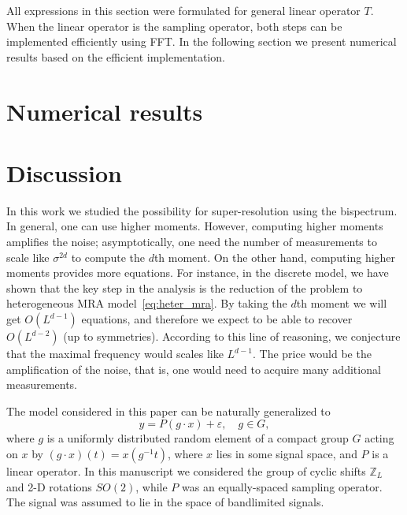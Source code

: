 \documentclass[english,12pt]{article}
\newcommand{\TODO}[1]{{\color{red}{[#1]}}}
\numberwithin{equation}{section}
\numberwithin{thm}{section} %
\begin{document}
All expressions in this section were formulated for general linear operator $T$. When the linear operator is the sampling operator, both steps can be implemented efficiently using FFT. In the following section we present numerical results based on the efficient implementation. 

\section{Numerical results}


\section{Discussion} \label{sec:future_work}


In this work we studied the possibility for super-resolution using the bispectrum. In general, one can use higher moments. However, computing higher moments amplifies the noise; asymptotically, one need the number of measurements to scale like $\sigma^{2d}$ to compute the $d$th moment. On the other hand, computing higher moments provides more equations. For instance, in the discrete model, we have shown that the key step in the analysis is the reduction of the problem to heterogeneous MRA model~\eqref{eq:heter_mra}.  By taking the $d$th moment we will get  $O(L^{d-1})$ equations, and therefore we expect to be able to recover $O(L^{d-2})$ (up to symmetries). According to this line of reasoning, we conjecture that the maximal frequency would scales like $L^{d-1}$. The price would be the amplification of the noise, that is, one would need to acquire many additional measurements.  

The model considered in this paper can be naturally generalized to 
\begin{equation} \label{eq:general_model}
y = P (g\cdot x) + \varepsilon,\quad g\in G,
\end{equation}
where $g$ is a uniformly distributed random element of a compact group $G$ acting on $x$ by $(g\cdot x)(t) = x(g^{-1}t)$, where $x$ lies in some signal space, and $P$ is a linear operator.  In this manuscript we considered the group of cyclic shifts $\mathbb{Z}_L$ and 2-D rotations $SO(2)$, while $P$ was an equally-spaced sampling operator. The signal was assumed to lie in the space of bandlimited signals.  \TODO{Refs to papers on bispectrum for general groups}
\end{document}
